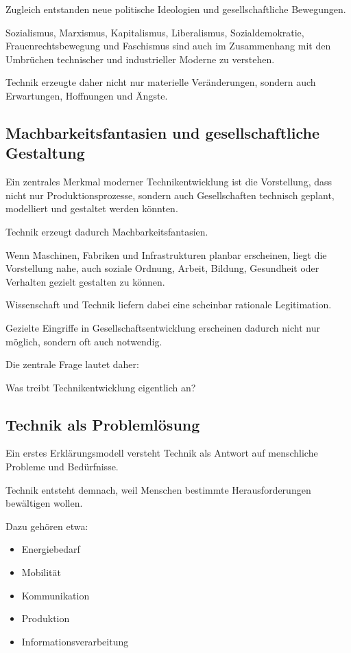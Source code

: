 Zugleich entstanden neue politische Ideologien
und gesellschaftliche Bewegungen.

Sozialismus,
Marxismus,
Kapitalismus,
Liberalismus,
Sozialdemokratie,
Frauenrechtsbewegung
und Faschismus
sind auch im Zusammenhang
mit den Umbrüchen technischer und industrieller Moderne zu verstehen.

Technik erzeugte daher nicht nur materielle Veränderungen,
sondern auch Erwartungen,
Hoffnungen und Ängste.

\subsection{Machbarkeitsfantasien und gesellschaftliche Gestaltung}

Ein zentrales Merkmal moderner Technikentwicklung
ist die Vorstellung,
dass nicht nur Produktionsprozesse,
sondern auch Gesellschaften
technisch geplant,
modelliert und gestaltet werden könnten.

Technik erzeugt dadurch Machbarkeitsfantasien.

Wenn Maschinen,
Fabriken und Infrastrukturen planbar erscheinen,
liegt die Vorstellung nahe,
auch soziale Ordnung,
Arbeit,
Bildung,
Gesundheit
oder Verhalten gezielt gestalten zu können.

Wissenschaft und Technik liefern dabei
eine scheinbar rationale Legitimation.

Gezielte Eingriffe in Gesellschaftsentwicklung
erscheinen dadurch nicht nur möglich,
sondern oft auch notwendig.

Die zentrale Frage lautet daher:

Was treibt Technikentwicklung eigentlich an?

\subsection{Technik als Problemlösung}

Ein erstes Erklärungsmodell versteht Technik
als Antwort auf menschliche Probleme und Bedürfnisse.

Technik entsteht demnach,
weil Menschen bestimmte Herausforderungen bewältigen wollen.

Dazu gehören etwa:

\begin{itemize}
\item Energiebedarf
\item Mobilität
\item Kommunikation
\item Produktion
\item Informationsverarbeitung
\end{itemize}

